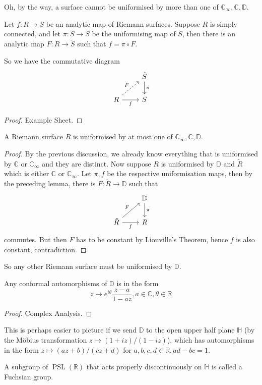 Oh, by the way, a surface cannot be uniformised by more than one of $\mathbb C_\infty,\mathbb C,\mathbb D$.
\begin{lemma}
    Let $f:R\to S$ be an analytic map of Riemann surfaces.
    Suppose $R$ is simply connected, and let $\pi:\tilde{S}\to S$ be the uniformising map of $S$, then there is an analytic map $F:R\to\tilde{S}$ such that $f=\pi\circ F$.
\end{lemma}
So we have the commutative diagram
\[
    \begin{tikzcd}
        &\tilde{S}\arrow{d}{\pi}\\
        R\arrow[dashed]{ur}{F}\arrow[swap]{r}{f}&S
    \end{tikzcd}
\]
\begin{proof}
    Example Sheet.
\end{proof}
\begin{proposition}
    A Riemann surface $R$ is uniformised by at most one of $\mathbb C_\infty,\mathbb C,\mathbb D$.
\end{proposition}
\begin{proof}
    By the previous discussion, we already know everything that is uniformised by $\mathbb C$ or $\mathbb C_\infty$ and they are distinct.
    Now suppose $R$ is uniformised by $\mathbb D$ and $\tilde{R}$ which is either $\mathbb C$ or $\mathbb C_\infty$.
    Let $\pi,f$ be the respective uniformisation maps, then by the preceding lemma, there is $F:\tilde{R}\to\mathbb D$ such that
    \[
        \begin{tikzcd}
            &\mathbb D\arrow{d}{\pi}\\
            \tilde{R}\arrow[swap]{r}{f}\arrow{ur}{F}&R
        \end{tikzcd}
    \]
    commutes.
    But then $F$ has to be constant by Liouville's Theorem, hence $f$ is also constant, contradiction.
\end{proof}
So any other Riemann surface must be uniformised by $\mathbb D$.
\begin{proposition}
    Any conformal automorphisms of $\mathbb D$ is in the form
    $$z\mapsto e^{i\theta}\frac{z-a}{1-\bar{a}z},a\in\mathbb C,\theta\in\mathbb R$$
\end{proposition}
\begin{proof}
    Complex Analysis.
\end{proof}
This is perhaps easier to picture if we send $\mathbb D$ to the open upper half plane $\mathbb H$ (by the M\"obius transformation $z\mapsto (1+iz)/(1-iz)$), which has automorphisms in the form $z\mapsto (az+b)/(cz+d)$ for $a,b,c,d\in\mathbb R,ad-bc=1$.
\begin{definition}
    A subgroup of $\operatorname{PSL}(\mathbb R)$ that acts properly discontinuously on $\mathbb H$ is called a Fuchsian group.
\end{definition}